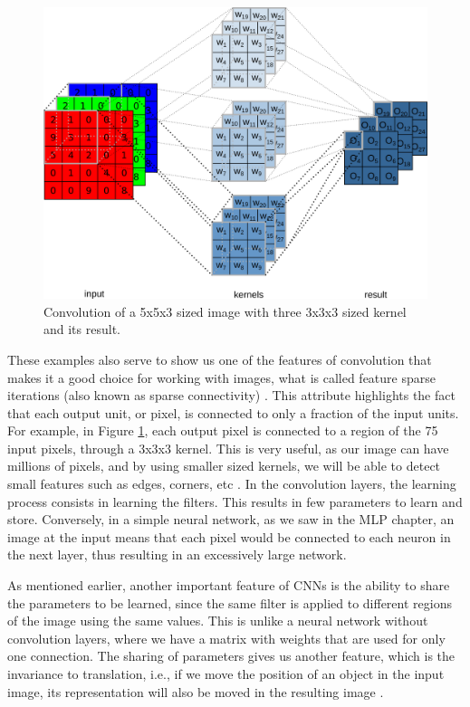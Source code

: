 \begin{figure}[h]
    \centering
    \includegraphics[scale=0.25]{"Part 3 - Learning Systems/Supervised Learning/Deep Learning/images/figure119.png"}
    \caption{Convolution of a 5x5x3 sized image with three 3x3x3 sized kernel and its result.}
    \label{fig:figure119}
\end{figure}

These examples also serve to show us one of the features of convolution that makes it a good choice for working with images, what is called feature sparse iterations (also known as sparse connectivity) \cite{goodfellow2016}. This attribute highlights the fact that each output unit, or pixel, is connected to only a fraction of the input units. For example, in Figure \ref{fig:figure119}, each output pixel is connected to a region of the 75 input pixels, through a 3x3x3 kernel. This is very useful, as our image can have millions of pixels, and by using smaller sized kernels, we will be able to detect small features such as edges, corners, etc \cite{goodfellow2016}. In the convolution layers, the learning process consists in learning the filters. This results in few parameters to learn and store. Conversely, in a simple neural network, as we saw in the MLP chapter, an image at the input means that each pixel would be connected to each neuron in the next layer, thus resulting in an excessively large network.

As mentioned earlier, another important feature of CNNs is the ability to share the parameters to be learned, since the same filter is applied to different regions of the image using the same values. This is unlike a neural network without convolution layers, where we have a matrix with weights that are used for only one connection. The sharing of parameters gives us another feature, which is the invariance to translation, i.e., if we move the position of an object in the input image, its representation will also be moved in the resulting image \cite{goodfellow2016}.

